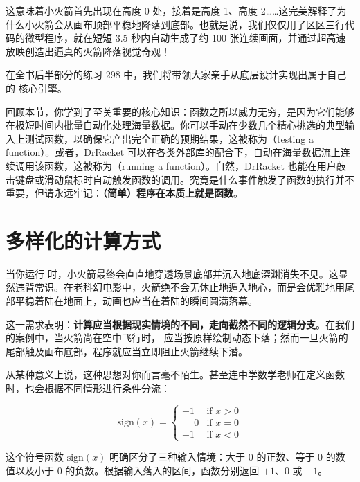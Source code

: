 这意味着小火箭首先出现在高度 0 处，接着是高度 1、高度 2……这完美解释了为什么小火箭会从画布顶部平稳地降落到底部。也就是说，我们仅仅用了区区三行代码的微型程序，就在短短 3.5 秒内自动生成了约 100 张连续画面，并通过超高速放映创造出逼真的火箭降落视觉奇观！

\begin{notebox}
在全书后半部分的练习 298 中，我们将带领大家亲手从底层设计实现出属于自己的  核心引擎。
\end{notebox}

回顾本节，你学到了至关重要的核心知识：函数之所以威力无穷，是因为它们能够在极短时间内批量自动化处理海量数据。你可以手动在少数几个精心挑选的典型输入上测试函数，以确保它产出完全正确的预期结果，这被称为（testing a function）。或者，DrRacket 可以在各类外部库的配合下，自动在海量数据流上连续调用该函数，这被称为（running a function）。自然，DrRacket 也能在用户敲击键盘或滑动鼠标时自动触发函数的调用。究竟是什么事件触发了函数的执行并不重要，但请永远牢记：\textbf{（简单）程序在本质上就是函数}。


\section{多样化的计算方式}
\label{sec:prologue:many_ways}

当你运行  时，小火箭最终会直直地穿透场景底部并沉入地底深渊消失不见。这显然违背常识。在老科幻电影中，火箭绝不会无休止地遁入地心，而是会优雅地用尾部平稳着陆在地面上，动画也应当在着陆的瞬间圆满落幕。

这一需求表明：\textbf{计算应当根据现实情境的不同，走向截然不同的逻辑分支}。在我们的案例中，当火箭尚在空中飞行时， 应当按原样绘制动态下落；然而一旦火箭的尾部触及画布底部，程序就应当立即阻止火箭继续下潜。

从某种意义上说，这种思想对你而言毫不陌生。甚至连中学数学老师在定义函数时，也会根据不同情形进行条件分流：

\[
  \mathrm{sign}(x) = \begin{cases}
    +1 & \text{if } x > 0 \\
    \phantom{+}0 & \text{if } x = 0 \\
    -1 & \text{if } x < 0
  \end{cases}
\]

这个符号函数 $\mathrm{sign}(x)$ 明确区分了三种输入情境：大于 0 的正数、等于 0 的数值以及小于 0 的负数。根据输入落入的区间，函数分别返回 $+1$、$0$ 或 $-1$。

